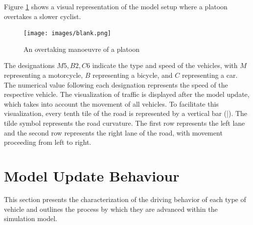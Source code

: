 Figure \ref{fig:overtaking} shows a visual representation of the model setup where a platoon overtakes a slower cyclist. 

\begin{figure}[h]
    \texttt{[image: images/blank.png]}
    \caption{An overtaking manoeuvre of a platoon}
    \label{fig:overtaking}
\end{figure}

The designations $M5, B2, C6$ indicate the type and speed of the vehicles, with $M$ representing a motorcycle, $B$ representing a bicycle, and $C$ representing a car. The numerical value following each designation represents the speed of the respective vehicle. The visualization of traffic is displayed after the model update, which takes into account the movement of all vehicles. To facilitate this visualization, every tenth tile of the road is represented by a vertical bar (|). The tilde symbol represents the road curvature. The first row represents the left lane and the second row represents the right lane of the road, with movement proceeding from left to right.


 \section{Model Update Behaviour}
 \label{sec:Model Update Behaviour}
This section presents the characterization of the driving behavior of each type of vehicle and outlines the process by which they are advanced within the simulation model.

